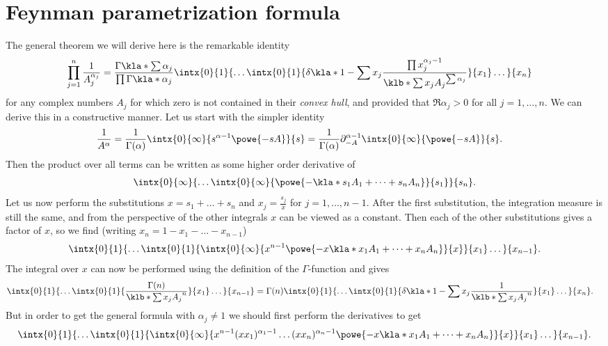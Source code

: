 \documentclass[english, parskip=full]{scrbook}
\begin{document}
\section{Feynman parametrization formula}
The general theorem we will derive here is the remarkable identity
\begin{align}
\prod_{j=1}^n \frac{1}{A_j^{\alpha_j}} &= \frac{\Gamma\kla*{\sum \alpha_j}}{\prod \Gamma\kla*{\alpha_j}} \intx{0}{1}{ \dots \intx{0}{1}{ \delta\kla*{1-\sum x_j} \frac{\prod x_j^{\alpha_j-1}}{\klb*{\sum x_jA_j}^{\sum \alpha_j}} }{x_1} \dots }{x_n}
\end{align}
for any complex numbers $A_j$ for which zero is not contained in their \emph{convex hull}, and provided that $\Re\alpha_j>0$ for all $j=1,\dots,n$.
We can derive this in a constructive manner.
Let us start with the simpler identity
\begin{align}
\frac{1}{A^\alpha} &= \frac{1}{\Gamma(\alpha)} \intx{0}{\infty}{s^{\alpha-1}\powe{-sA}}{s} = \frac{1}{\Gamma(\alpha)} \partial_{-A}^{\alpha-1} \intx{0}{\infty}{\powe{-sA}}{s}.
\end{align}
Then the product over all terms can be written as some higher order derivative of
\begin{align}
\intx{0}{\infty}{\dots \intx{0}{\infty}{ \powe{-\kla*{s_1A_1+\dots+s_nA_n}} }{s_1}}{s_n}.
\end{align}
Let us now perform the substitutions $x=s_1+\dots+s_n$ and $x_j=\frac{s_j}{x}$ for $j=1,\dots,n-1$.
After the first substitution, the integration measure is still the same, and from the perspective of the other integrals $x$ can be viewed as a constant.
Then each of the other substitutions gives a factor of $x$, so we find (writing $x_n=1-x_1-\dots-x_{n-1}$)
\begin{align}
\intx{0}{1}{\dots \intx{0}{1}{ \intx{0}{\infty}{ x^{n-1} \powe{-x\kla*{x_1A_1+\dots + x_nA_n}} }{x}}{x_1}\dots}{x_{n-1}}.
\end{align}
The integral over $x$ can now be performed using the definition of the $\Gamma$-function and gives
\begin{align}
\intx{0}{1}{\dots \intx{0}{1}{ \frac{\Gamma(n)}{\klb*{\sum x_jA_j}^n} }{x_1} \dots}{x_{n-1}} &= \Gamma(n) \intx{0}{1}{\dots \intx{0}{1}{ \delta\kla*{1 - \sum x_j} \frac{1}{\klb*{\sum x_jA_j}^n} }{x_1} \dots}{x_{n}}.
\end{align}
But in order to get the general formula with $\alpha_j\neq 1$ we should first perform the derivatives to get
\begin{align}
\intx{0}{1}{\dots \intx{0}{1}{ \intx{0}{\infty}{ x^{n-1} (xx_1)^{\alpha_1-1} \dots (xx_n)^{\alpha_n-1} \powe{-x\kla*{x_1A_1+\dots + x_nA_n}} }{x}}{x_1}\dots}{x_{n-1}}.
\end{align}
\end{document}
